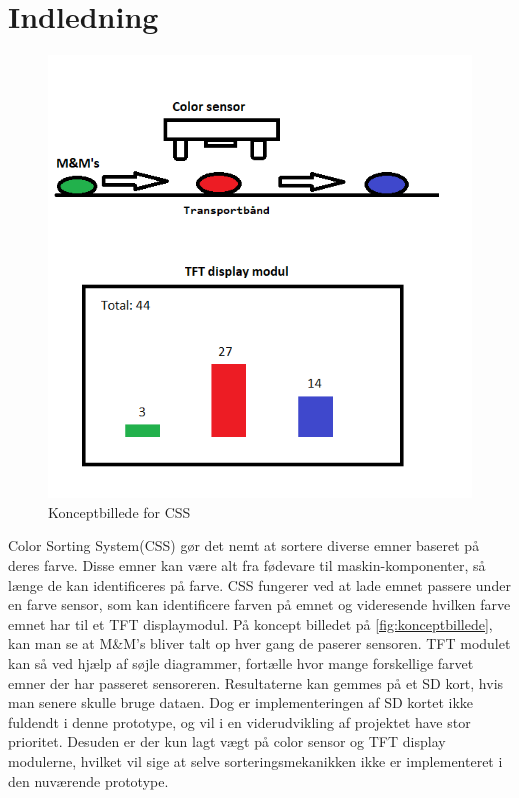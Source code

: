 \graphicspath{{Chapters/Indledning/}}

\section{Indledning}


\begin{figure}[H]
	\centering
	\includegraphics[width = 400pt]{Img/KonceptBillede}
	\caption{Konceptbillede for CSS}
	\label{fig:konceptbillede}
\end{figure}

Color Sorting System(CSS) gør det nemt at sortere diverse emner baseret på deres farve. Disse emner kan være alt fra fødevare til maskin-komponenter, så længe de kan identificeres på farve. CSS fungerer ved at lade emnet passere under en farve sensor, som kan identificere farven på emnet og videresende hvilken farve emnet har til et TFT displaymodul. På koncept billedet på \autoref{fig:konceptbillede}, kan man se at M\&M's bliver talt op hver gang de paserer sensoren. TFT modulet kan så ved hjælp af søjle diagrammer, fortælle hvor mange forskellige farvet emner der har passeret sensoreren. Resultaterne kan gemmes på et SD kort, hvis man senere skulle bruge dataen. Dog er implementeringen af SD kortet ikke fuldendt i denne prototype, og vil i en viderudvikling af projektet have stor prioritet. Desuden er der kun lagt vægt på color sensor og TFT display modulerne, hvilket vil sige at selve sorteringsmekanikken ikke er implementeret i den nuværende prototype.
	
\newpage

